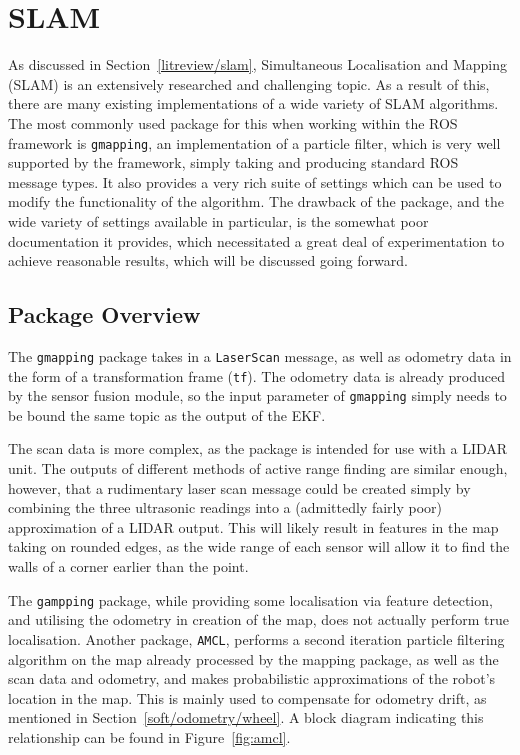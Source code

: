 \section{SLAM}\label{soft/SLAM}

As discussed in Section~\ref{litreview/slam}, Simultaneous Localisation and Mapping (SLAM) is an extensively 
researched and challenging topic. As a result of this, there are many existing implementations of a wide
variety of SLAM algorithms. The most commonly used package for this when working within the ROS framework
is \verb|gmapping|, an implementation of a particle filter, which is very well supported by the framework,
simply taking and producing standard ROS message types. It also provides a very rich suite of settings which
can be used to modify the functionality of the algorithm. The drawback of the package, and the wide variety
of settings available in particular, is the somewhat poor documentation it provides, which necessitated a
great deal of experimentation to achieve reasonable results, which will be discussed going forward.

\subsection{Package Overview}\label{soft/SLAM/package}

The \verb|gmapping| package takes in a \verb|LaserScan| message, as well as odometry data in the form of a
transformation frame (\verb|tf|). The odometry data is already produced by the sensor fusion module, so the
input parameter of \verb|gmapping| simply needs to be bound the same topic as the output of the EKF.

The scan data is more complex, as the package is intended for use with a LIDAR unit. The outputs of different
methods of active range finding are similar enough, however, that a rudimentary laser scan message could be
created simply by combining the three ultrasonic readings into a (admittedly fairly poor) approximation of a
LIDAR output. This will likely result in features in the map taking on rounded edges, as the wide range of
each sensor will allow it to find the walls of a corner earlier than the point.

The \verb|gampping| package, while providing some localisation via feature detection, and utilising the odometry
in creation of the map, does not actually perform true localisation. Another package, \verb|AMCL|, performs a
second iteration particle filtering algorithm on the map already processed by the mapping package, as well as
the scan data and odometry, and makes probabilistic approximations of the robot's location in the map. This is
mainly used to compensate for odometry drift, as mentioned in Section~\ref{soft/odometry/wheel}. A block diagram
indicating this relationship can be found in Figure~\ref{fig:amcl}.

